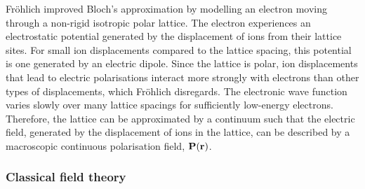 Fr\"ohlich improved Bloch's approximation by modelling an electron moving through a non-rigid isotropic polar lattice. The electron experiences an electrostatic potential generated by the displacement of ions from their lattice sites. For small ion displacements compared to the lattice spacing, this potential is one generated by an electric dipole. Since the lattice is polar, ion displacements that lead to electric polarisations interact more strongly with electrons than other types of displacements, which Fr\"ohlich disregards. The electronic wave function varies slowly over many lattice spacings for sufficiently low-energy electrons. Therefore, the lattice can be approximated by a continuum such that the electric field, generated by the displacement of ions in the lattice, can be described by a macroscopic continuous polarisation field, $\vb{P}(\vb{r})$. 

\subsubsection{Classical field theory}
\label{subsubsec:2-1-2-1}

